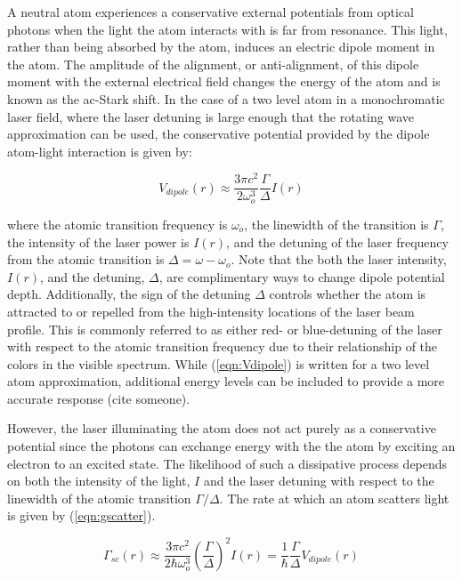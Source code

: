 A neutral atom experiences a conservative external potentials from optical photons when the light the atom interacts with is far from resonance.  This light, rather than being absorbed by the atom, induces an electric dipole moment in the atom. The amplitude of the alignment, or anti-alignment, of this dipole moment with the external electrical field changes the energy of the atom and is known as the ac-Stark shift. In the case of a two level atom in a monochromatic laser field, where the laser detuning is large enough that the rotating wave approximation can be used, the conservative potential provided by the dipole atom-light interaction is given by: 

\begin{equation}
\label{eqn:Vdipole}
	V_{dipole} (r) \approx \frac{3\pi c^2}{2 \omega_o^3}\frac{\Gamma}{\Delta} I(r)
\end{equation}


where the atomic transition frequency is $\omega_o$, the linewidth of the transition is $\Gamma$, the intensity of the laser power is $I(r)$, and the detuning of the laser frequency from the atomic transition is $\Delta = \omega-\omega_o$. Note that the both the laser intensity, $I(r)$, and the detuning, $\Delta$, are complimentary ways to change dipole potential depth. Additionally, the sign of the detuning $\Delta$ controls whether the atom is attracted to or repelled from the high-intensity locations of the laser beam profile. This is commonly referred to as either red- or blue-detuning of the laser with respect to the atomic transition frequency due to their relationship of the colors in the visible spectrum. While (\ref{eqn:Vdipole}) is written for a two level atom approximation, additional energy levels can be included to provide a more accurate response (cite someone).

However, the laser illuminating the atom does not act purely as a conservative potential since the photons can exchange energy with the the atom by exciting an electron to an excited state. The likelihood of such a dissipative process depends on both the intensity of the light, $I$ and the laser detuning with respect to the linewidth of the atomic transition $\Gamma/\Delta$. The rate at which an atom scatters light is given by (\ref{eqn:gscatter}).

\begin{equation}
\label{eqn:gscatter}
	\Gamma_{sc}(r) \approx \frac{3 \pi c^2}{2 \hbar \omega_o^3} \left ( \frac{\Gamma}{\Delta}  \right )^2 I(r) = \frac{1}{\hbar} \frac{\Gamma}{\Delta} V_{dipole}(r)
\end{equation}

